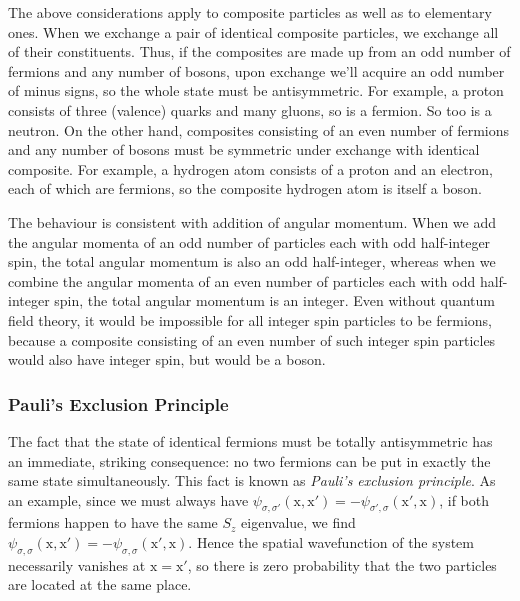 \documentclass{article}
\theoremstyle{plain}\theoremheaderfont{\normalfont\itshape}\theorembodyfont{\rmfamily}\theoremseparator{.}\newtheorem*{rem}{Remark}\newtheorem*{ex}{Example}\newtheorem*{proof}{Proof}\newtheorem*{altp}{Alternative proof}
\theoremstyle{plain}\theoremheaderfont{\normalfont\bfseries}\theorembodyfont{\rmfamily}\theoremseparator{.}\newtheorem{thm}{Theorem}[section]\newtheorem{lem}[thm]{Lemma}\newtheorem{prop}[thm]{Proposition}\newtheorem*{cor}{Corollary}\newtheorem{defn}[thm]{Definition}\newtheorem{clm}[thm]{Claim}\newtheorem{clminproof}{Claim}
\theoremstyle{break}\theoremheaderfont{\normalfont\itshape}\theorembodyfont{\rmfamily}\theoremseparator{.\medskip}\newtheorem*{proofskip}{Proof}\newtheorem*{exs}{Examples}\newtheorem*{rems}{Remarks}
\theoremstyle{break}\theoremheaderfont{\normalfont\bfseries}\theorembodyfont{\rmfamily}\theoremseparator{.\medskip}\newtheorem{lemskip}[thm]{Lemma}\newtheorem{defnskip}[thm]{Definition}\newtheorem{propskip}[thm]{Proposition}\newtheorem{thmskip}[thm]{Theorem}
\numberwithin{equation}{section}
\newcommand{\vb}[1]{\bm{\mathrm{#1}}}
\begin{document}
    The above considerations apply to composite particles as well as to elementary ones. When we exchange a pair of identical composite particles, we exchange all of their constituents. Thus, if the composites are made up from an odd number of fermions and any number of bosons, upon exchange we'll acquire an odd number of minus signs, so the whole state must be antisymmetric. For example, a proton consists of three (valence) quarks and many gluons, so is a fermion. So too is a neutron. On the other hand, composites consisting of an even number of fermions and any number of bosons must be symmetric under exchange with identical composite. For example, a hydrogen atom consists of a proton and an electron, each of which are fermions, so the composite hydrogen atom is itself a boson.

    The behaviour is consistent with addition of angular momentum. When we add the angular momenta of an odd number of particles each with odd half-integer spin, the total angular momentum is also an odd half-integer, whereas when we combine the angular momenta of an even number of particles each with odd half-integer spin, the total angular momentum is an integer. Even without quantum field theory, it would be impossible for all integer spin particles to be fermions, because a composite consisting of an even number of such integer spin particles would also have integer spin, but would be a boson.

    \subsubsection{Pauli's Exclusion Principle}
    The fact that the state of identical fermions must be totally antisymmetric has an immediate, striking consequence: no two fermions can be put in exactly the same state simultaneously. This fact is known as \textit{Pauli's exclusion principle}. As an example, since we must always have \(\psi_{\sigma,\sigma'}(\vb{x},\vb{x}')=-\psi_{\sigma',\sigma}(\vb{x}',\vb{x})\), if both fermions happen to have the same \(S_z\) eigenvalue, we find \(\psi_{\sigma,\sigma}(\vb{x},\vb{x}')=-\psi_{\sigma,\sigma}(\vb{x}',\vb{x})\). Hence the spatial wavefunction of the system necessarily vanishes at \(\vb{x}=\vb{x}'\), so there is zero probability that the two particles are located at the same place.
\end{document}
